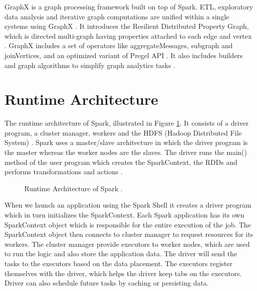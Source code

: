 \documentclass[9pt,twocolumn,twoside]{../../styles/osajnl}
\begin{document}
GraphX is a graph processing framework built on top of Spark. ETL,
exploratory data analysis and iterative graph computations are unified
within a single systems using GraphX \cite{www-spark-graphx}. It
introduces the Resilient Distributed Property Graph, which is directed
multi-graph having properties attached to each edge and vertex
\cite{book-spark-stream}. GraphX includes a set of operators like
aggregateMessages, subgraph and joinVertices, and an optimized variant
of Pregel API \cite{www-spark-graphx}. It also includes builders and
graph algorithms to simplify graph analytics tasks
\cite{article-spark-1}.

\section{Runtime Architecture}

The runtime architecture of Spark, illustrated in Figure
\ref{fig:spark-runtime}. It consists of a driver program, a cluster
manager, workers and the HDFS (Hadoop Distributed File System)
\cite{article-spark-1}.  Spark uses a master/slave architecture in
which the driver program is the master whereas the worker nodes are
the slaves. The driver runs the main() method of the user program
which creates the SparkContext, the RDDs and performs transformations
and actions \cite{book-spark}.

\begin{figure}[htbp]
\centering
{}
\caption{Runtime Architecture of Spark \cite{www-spark-cluster}.}
\label{fig:spark-runtime}
\end{figure}

When we launch an application using the Spark Shell it creates a
driver program which in turn initializes the SparkContext. Each Spark
application has its own SparkContext object which is responsible for
the entire execution of the job. The SparkContext object then connects
to cluster manager to request resources for its workers. The cluster
manager provide executors to worker nodes, which are used to run the
logic and also store the application data. The driver will send the
tasks to the executors based on the data placement. The executors
register themselves with the driver, which helps the driver keep tabs
on the executors. Driver can also schedule future tasks by caching or
persisting data.
\end{document}
